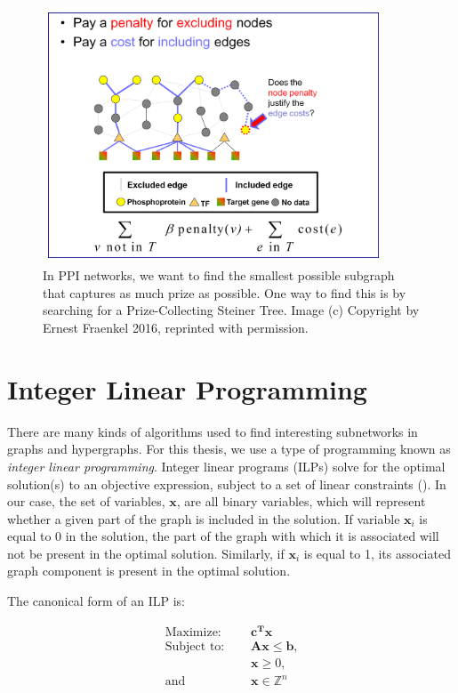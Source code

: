 \documentclass[12pt,twoside]{reedthesis}
\theoremstyle{definition}
\begin{document}
  \begin{figure}[!h]
    \begin{center}
      \includegraphics[width=4in]{PCST}
    \caption[Prize-Collecting Steiner Tree]{In PPI networks, we want to find the smallest possible subgraph that captures as much prize as possible. One way to find this is by searching for a Prize-Collecting Steiner Tree. Image (c) Copyright by Ernest Fraenkel 2016, reprinted with permission.}
    \label{fig:PCST}
    \end{center}
  \end{figure}

 \section{Integer Linear Programming}

  There are many kinds of algorithms used to find interesting subnetworks in graphs and hypergraphs.  For this thesis, we use a type of programming known as \textit{integer linear programming}. Integer linear programs (ILPs) solve for the optimal solution(s) to an objective expression, subject to a set of linear constraints (\cite{Papadimitriou1998}). In our case, the set of variables, $\mathbf{x}$, are all binary variables, which will represent whether a given part of the graph is included in the solution. If variable $\mathbf{x}_i$ is equal to 0 in the solution, the part of the graph with which it is associated will not be present in the optimal solution. Similarly, if $\mathbf{x}_i$ is equal to 1, its associated graph component is present in the optimal solution.\par

  The canonical form of an ILP is:\par

  \begin{align}
    \text{Maximize: }\quad&\mathbf{c^Tx}\label{eq:obj_canonical}\\
    \text{Subject to: }\quad&\mathbf{Ax}\leq\mathbf{b}\text{,}\label{eq:constA}\\
    &\mathbf{x} \geq 0 \text{,}\label{eq:constB}\\
    \text{and } \quad & \mathbf{x} \in \mathbb{Z}^n \label{eq:constC}
  \end{align}
\end{document}
